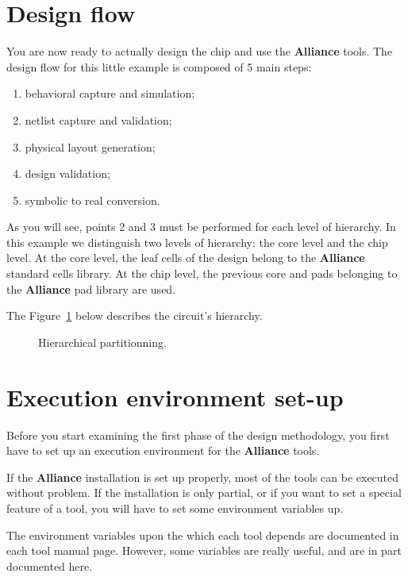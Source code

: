 \documentclass{article}
\begin{document}
%
\section{Design flow}
\label{desginflow}

You are now ready to actually design the chip and use the
\textbf{Alliance} tools.
The design flow for this little example is composed of 5 main 
steps:
\begin{enumerate}
\item behavioral capture and simulation;
\item netlist capture and validation;
\item physical layout generation;
\item design validation;
\item symbolic to real conversion.
\end{enumerate}

As you will see, points 2 and 3 must be performed for each level of 
hierarchy.
In this example we distinguish two levels of hierarchy: the core 
level and the chip level.
At the core level, the leaf cells of the design belong to the
\textbf{Alliance} standard cells library.
At the chip level, the previous core and pads belonging to the
\textbf{Alliance} pad library are used.

The Figure~\ref{hier} below describes the circuit's hierarchy.

\begin{figure}\center
\leavevmode{}
\caption{\label{hier}Hierarchical partitionning.}
\end{figure}

%
\section{Execution environment set-up}
\label{setup}

Before you start examining the first phase of the design methodology, 
you first have to set up an execution environment for the
\textbf{Alliance} tools.

If the \textbf{Alliance} installation is set up properly, most of the 
tools can be executed without problem.
If the installation is only 
partial, or if you want to set a special feature of a tool, you will 
have to set some environment variables up.

The environment variables upon the which each tool depends are 
documented in each tool manual page.
However, some variables are really useful, and are in part documented 
here.
\end{document}
